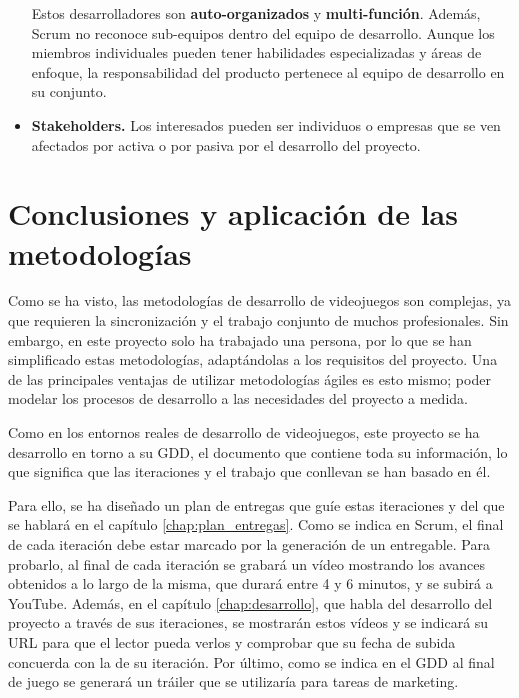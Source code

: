\begin{itemize}
Estos desarrolladores son \textbf{auto-organizados} y \textbf{multi-función}. Además, Scrum no reconoce sub-equipos dentro del equipo de desarrollo. Aunque los miembros individuales pueden tener habilidades especializadas y áreas de enfoque, la responsabilidad del producto pertenece al equipo de desarrollo en su conjunto.

\item \textbf{Stakeholders.} Los interesados pueden ser individuos o empresas que se ven afectados por activa o por pasiva por el desarrollo del proyecto.

\end{itemize}

\section{Conclusiones y aplicación de las metodologías}

Como se ha visto, las metodologías de desarrollo de videojuegos son complejas, ya que requieren la sincronización y el trabajo conjunto de muchos profesionales. Sin embargo, en este proyecto solo ha trabajado una persona, por lo que se han simplificado estas metodologías, adaptándolas a los requisitos del proyecto. Una de las principales ventajas de utilizar metodologías ágiles es esto mismo; poder modelar los procesos de desarrollo a las necesidades del proyecto a medida. 

Como en los entornos reales de desarrollo de videojuegos, este proyecto se ha desarrollo en torno a su \acs{GDD}, el documento que contiene toda su información, lo que significa que las iteraciones y el trabajo que conllevan se han basado en él.

Para ello, se ha diseñado un plan de entregas que guíe estas iteraciones y del que se hablará en el capítulo \ref{chap:plan_entregas}. Como se indica en Scrum, el final de cada iteración debe estar marcado por la generación de un entregable. Para probarlo, al final de cada iteración se grabará un vídeo mostrando los avances obtenidos a lo largo de la misma, que durará entre 4 y 6 minutos, y se subirá a YouTube. Además, en el capítulo \ref{chap:desarrollo}, que habla del desarrollo del proyecto a través de sus iteraciones, se mostrarán estos vídeos y se indicará su URL para que el lector pueda verlos y comprobar que su fecha de subida concuerda con la de su iteración. Por último, como se indica en el \acs{GDD} al final de juego se generará un tráiler que se utilizaría para tareas de marketing.

